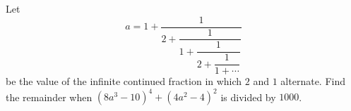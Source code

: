 Let
\[a=1+\dfrac{1}{2+\dfrac{1}{1+\dfrac{1}{2+\dfrac{1}{1+\cdots}}}}\]
be the value of the infinite continued fraction in which $2$ and $1$ alternate. Find the remainder when $\left(8a^3-10\right)^4+\left(4a^2-4\right)^2$ is divided by $1000$.
